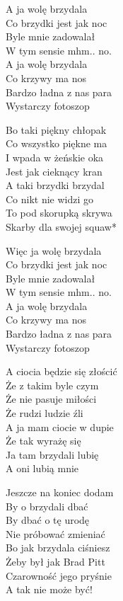\begin{text}
    A ja wolę brzydala\\
    Co brzydki jest jak noc\\
    Byle mnie zadowalał\\
    W tym sensie mhm.. no.\\
    A ja wolę brzydala\\
    Co krzywy ma nos\\
    Bardzo ładna z nas para\\
    Wystarczy fotoszop

    Bo taki piękny chłopak\\
    Co wszystko piękne ma\\
    I wpada w żeńskie oka\\
    Jest jak cieknący kran\\
    A taki brzydki brzydal\\
    Co nikt nie widzi go\\
    To pod skorupką skrywa\\
    Skarby dla swojej squaw*

    \vin Więc ja wolę brzydala\\
    \vin Co brzydki jest jak noc\\
    \vin Byle mnie zadowalał\\
    \vin W tym sensie mhm.. no.\\
    \vin A ja wolę brzydala\\
    \vin Co krzywy ma nos\\
    \vin Bardzo ładna z nas para\\
    \vin Wystarczy fotoszop

    A ciocia będzie się złościć\\
    Że z takim byle czym\\
    Że nie pasuje miłości\\
    Że rudzi ludzie źli\\
    A ja mam ciocie w dupie\\
    Że tak wyrażę się\\
    Ja tam brzydali lubię\\
    A oni lubią mnie

    Jeszcze na koniec dodam\\
    By o brzydali dbać\\
    By dbać o tę urodę\\
    Nie próbować zmieniać\\
    Bo jak brzydala ciśniesz\\
    Żeby był jak Brad Pitt\\
    Czarowność jego pryśnie\\
    A tak nie może być!

\end{text}
\begin{chord}

\end{chord}